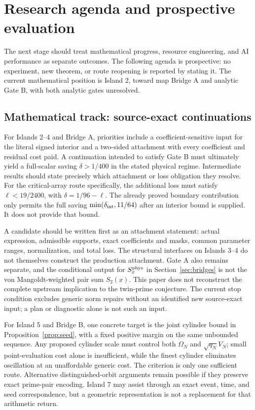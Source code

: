 \section{Research agenda and prospective evaluation}\label{sec:agenda}
The next stage should treat mathematical progress, resource engineering, and AI performance as separate outcomes. The following agenda is prospective: no experiment, new theorem, or route reopening is reported by stating it. The current mathematical position is Island 2, toward map Bridge A and analytic Gate B, with both analytic gates unresolved.

\subsection{Mathematical track: source-exact continuations}
For Islands 2--4 and Bridge A, priorities include a coefficient-sensitive input for the literal signed interior and a two-sided attachment with every coefficient and residual cost paid. A continuation intended to satisfy Gate B must ultimately yield a full-scalar saving $\delta>1/400$ in the stated physical regime. Intermediate results should state precisely which attachment or loss obligation they resolve. For the critical-array route specifically, the additional loss must satisfy $\ell<19/2400$, with $\delta=1/96-\ell$. The already proved boundary contribution only permits the full saving $\min(\delta_{\rm int},11/64)$ after an interior bound is supplied. It does not provide that bound.

A candidate should be written first as an attachment statement: actual expression, admissible supports, exact coefficients and masks, common parameter ranges, normalization, and total loss. The structural interfaces on Islands 3--4 do not themselves construct the production attachment. Gate A also remains separate, and the conditional output for $S_x^{\rm phys}$ in Section~\ref{sec:bridges} is not the von Mangoldt-weighted pair sum $S_2(x)$. This paper does not reconstruct the complete upstream implication to the twin-prime conjecture. The current stop condition excludes generic norm repairs without an identified new source-exact input; a plan or diagnostic alone is not such an input.

For Island 5 and Bridge B, one concrete target is the joint cylinder bound in Proposition~\ref{prop:seed}, with a fixed positive margin on the same unbounded sequence. Any proposed cylinder scale must control both $\Omega_N$ and $\sqrt{q_N}V_N$; small point-evaluation cost alone is insufficient, while the finest cylinder eliminates oscillation at an unaffordable generic cost. The criterion is only one sufficient route. Alternative distinguished-orbit arguments remain possible if they preserve exact prime-pair encoding. Island 7 may assist through an exact event, time, and seed correspondence, but a geometric representation is not a replacement for that arithmetic return.

